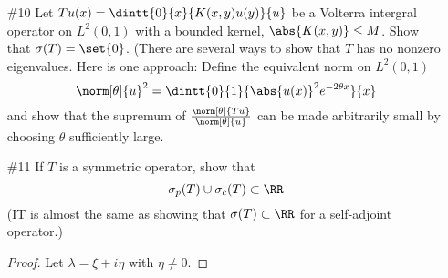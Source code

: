 \documentclass[11pt, oneside]{article}
\begin{document}
\begin{enumerate}
\begin{enumerate}
\begin{proof}
        \end{proof}
    \end{enumerate}

  \pagebreak
  \item[\#10]
    Let $Tu(x) = \dintt{0}{x}{K(x, y)u(y)}{u}$ be a Volterra intergral operator
    on $L^2(0, 1)$ with a bounded kernel, $\abs{K(x, y)} \le M$.
    Show that $\sigma(T) = \set{0}$.
    (There are several ways to show that $T$ has no nonzero eigenvalues.
    Here is one approach: Define the equivalent norm on $L^2(0, 1)$
    \[
      \norm[\theta]{u}^2 = \dintt{0}{1}{\abs{u(x)}^2e^{-2\theta x}}{x}
    \]
    and show that the supremum of $\frac{\norm[\theta]{Tu}}{\norm[\theta]{u}}$
    can be made arbitrarily small by choosing $\theta$ sufficiently large.

  \pagebreak
  \item[\#11]
    If $T$ is a symmetric operator, show that
    \[
      \sigma_p(T) \cup \sigma_c(T) \subset \RR
    \]
    (IT is almost the same as showing that $\sigma(T) \subset \RR$ for a
    self-adjoint operator.)

    \begin{proof}
      Let $\lambda = \xi + i \eta$ with $\eta \neq 0$.
    \end{proof}
\end{enumerate}
\end{document}
